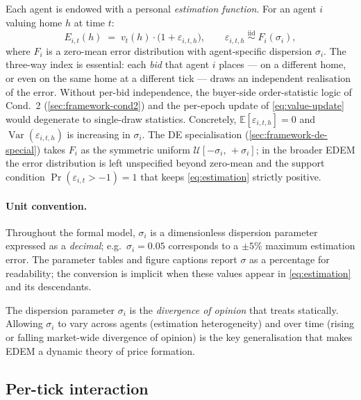 Each agent is endowed with a personal \emph{estimation function}.
For an agent $i$ valuing home $h$ at time $t$:
\begin{equation}
\label{eq:estimation}
E_{i,t}(h) \;=\; v_{t}(h) \cdot \bigl(1 + \varepsilon_{i,t,h}\bigr),
\qquad
\varepsilon_{i,t,h} \;\stackrel{\mathrm{iid}}{\sim}\; F_{i}(\sigma_{i}),
\end{equation}
where $F_{i}$ is a zero-mean error distribution with agent-specific
dispersion $\sigma_{i}$. The three-way index is essential: each
\emph{bid} that agent $i$ places --- on a different home, or even on
the same home at a different tick --- draws an independent realisation
of the error. Without per-bid independence, the buyer-side
order-statistic logic of Cond.~2 (\cref{sec:framework-cond2}) and
the per-epoch update of \cref{eq:value-update} would degenerate to
single-draw statistics. Concretely,
$\mathbb{E}[\varepsilon_{i,t,h}] = 0$ and
$\operatorname{Var}(\varepsilon_{i,t,h})$ is increasing in
$\sigma_{i}$. The DE specialisation
(\cref{sec:framework-de-special}) takes $F_{i}$ as the symmetric
uniform $\mathcal{U}[-\sigma_{i},\,+\sigma_{i}]$; in the broader
EDEM the error distribution is left unspecified beyond zero-mean and
the support condition $\Pr(\varepsilon_{i,t} > -1) = 1$ that keeps
\cref{eq:estimation} strictly positive.

\paragraph{Unit convention.} Throughout the formal model,
$\sigma_{i}$ is a dimensionless dispersion parameter expressed as a
\emph{decimal}; e.g.\ $\sigma_{i} = 0.05$ corresponds to a $\pm 5\%$
maximum estimation error. The parameter tables and figure captions
report $\sigma$ as a percentage for readability; the conversion is
implicit when these values appear in \cref{eq:estimation} and its
descendants.

The dispersion parameter $\sigma_{i}$ is the \emph{divergence of
opinion} that \citet{miller1977} treats statically. Allowing
$\sigma_{i}$ to vary across agents (estimation heterogeneity) and over
time (rising or falling market-wide divergence of opinion) is the key
generalisation that makes EDEM a dynamic theory of price formation.

\subsection{Per-tick interaction}
\label{sec:framework-interaction}

